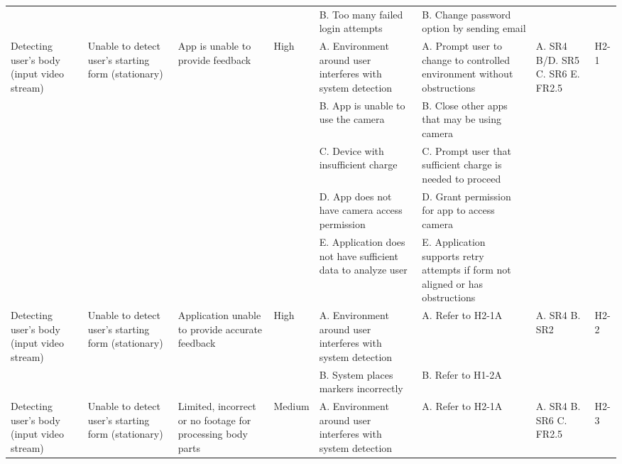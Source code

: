 \documentclass{article}
\begin{document}
\begin{landscape}
\begin{center}
\begin{xltabular}{\linewidth}{
    L{1.6cm}  
    L{1.8cm}  
    L{2cm}    
    L{0.8cm}  
    L{2cm}    
    L{2.2cm}  
    L{1.3cm}  
    L{0.8cm}  
}
& & & & 
B. Too many failed login attempts & 
B. Change password option by sending email & 
& \\


Detecting user's body (input video stream) & 
Unable to detect user's starting form (stationary) & 
App is unable to provide feedback & 
High & 
A. Environment around user interferes with system detection & 
A. Prompt user to change to controlled environment without obstructions & 
A. SR4 \newline
B/D. SR5 \newline
C. SR6 \newline
E. FR2.5 & 
H2-1 \\

& & & & 
B. App is unable to use the camera & 
B. Close other apps that may be using camera & 
& \\

& & & & 
C. Device with insufficient charge & 
C. Prompt user that sufficient charge is needed to proceed & 
& \\

& & & & 
D. App does not have camera access permission & 
D. Grant permission for app to access camera & 
& \\

& & & & 
E. Application does not have sufficient data to analyze user & 
E. Application supports retry attempts if form not aligned or has obstructions & 
& \\


Detecting user's body (input video stream) & 
Unable to detect user's starting form (stationary) & 
Application unable to provide accurate feedback & 
High & 
A. Environment around user interferes with system detection & 
A. Refer to H2-1A & 
A. SR4 \newline
B. SR2 &
H2-2 \\

& & & & 
B. System places markers incorrectly & 
B. Refer to H1-2A & 
& \\


Detecting user's body (input video stream) & 
Unable to detect user's starting form (stationary) & 
Limited, incorrect or no footage for processing body parts & 
Medium & 
A. Environment around user interferes with system detection & 
A. Refer to H2-1A & 
A. SR4 \newline
B. SR6 \newline
C. FR2.5 & 
H2-3 \\


\end{xltabular}
\end{center}
\end{landscape}
\end{document}
